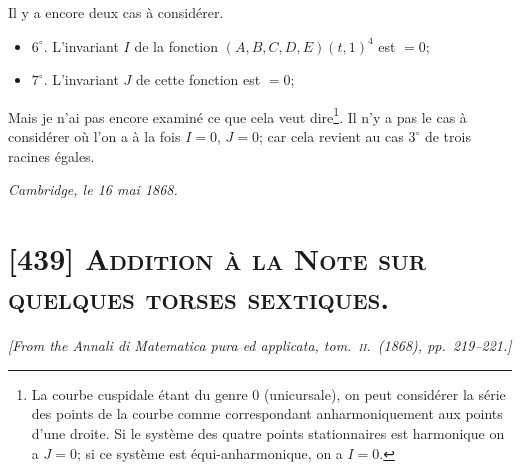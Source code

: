 \documentclass[11pt,a4paper]{article}
\begin{document}
Il y a encore deux cas \`a consid\'erer.

\begin{itemize}[label={}]
\item $6^\circ$. L'invariant $I$ de la fonction $(A, B, C, D, E)(t, 1)^4$ est $= 0$;
\item $7^\circ$. L'invariant $J$ de cette fonction est $= 0$;
\end{itemize}

Mais je n'ai pas encore examin\'e ce que cela veut dire\footnote{La courbe cuspidale
\'etant du genre $0$ (unicursale), on peut consid\'erer la s\'erie des points de la
courbe comme correspondant anharmoniquement aux points d'une droite. Si le syst\`eme des
quatre points stationnaires est harmonique on a $J = 0$; si ce syst\`eme est
\'equi-anharmonique, on a $I = 0$.}. Il n'y a pas le cas \`a consid\'erer o\`u l'on a \`a
la fois $I = 0$, $J = 0$; car cela revient au cas $3^\circ$ de trois racines \'egales.

\begin{flushright}
\textit{Cambridge, le 16 mai 1868.}
\end{flushright}

\clearpage

\section{[439] \textsc{Addition \`a la Note sur quelques torses sextiques.}}

\begin{center}
\textit{[From the Annali di Matematica pura ed applicata, tom.\ \textsc{ii}.\ (1868), pp.\ 219--221.]}
\end{center}

\medskip
\end{document}
